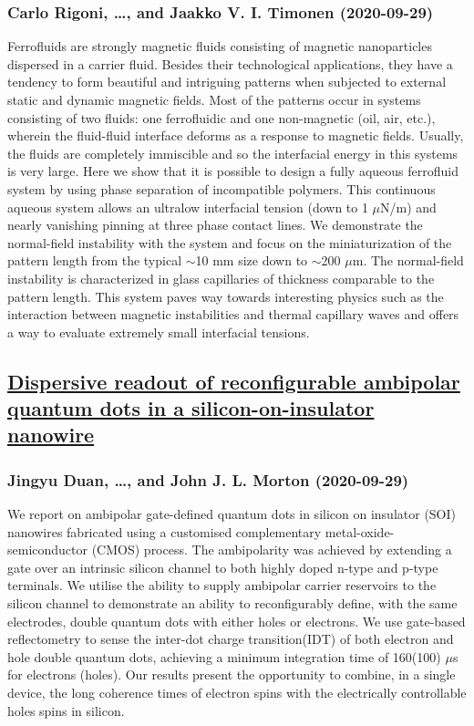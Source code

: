 \subsubsection*{Carlo Rigoni, \dots, and Jaakko V. I. Timonen (2020-09-29)}
Ferrofluids are strongly magnetic fluids consisting of magnetic nanoparticles
dispersed in a carrier fluid. Besides their technological applications, they
have a tendency to form beautiful and intriguing patterns when subjected to
external static and dynamic magnetic fields. Most of the patterns occur in
systems consisting of two fluids: one ferrofluidic and one non-magnetic (oil,
air, etc.), wherein the fluid-fluid interface deforms as a response to magnetic
fields. Usually, the fluids are completely immiscible and so the interfacial
energy in this systems is very large. Here we show that it is possible to
design a fully aqueous ferrofluid system by using phase separation of
incompatible polymers. This continuous aqueous system allows an ultralow
interfacial tension (down to 1 $\mu$N/m) and nearly vanishing pinning at three
phase contact lines. We demonstrate the normal-field instability with the
system and focus on the miniaturization of the pattern length from the typical
$\sim$10 mm size down to $\sim$200 $\mu$m. The normal-field instability is
characterized in glass capillaries of thickness comparable to the pattern
length. This system paves way towards interesting physics such as the
interaction between magnetic instabilities and thermal capillary waves and
offers a way to evaluate extremely small interfacial tensions.

\subsection*{\href{http://arxiv.org/abs/2009.13944v1}{Dispersive readout of reconfigurable ambipolar quantum dots in a  silicon-on-insulator nanowire}}
\subsubsection*{Jingyu Duan, \dots, and John J. L. Morton (2020-09-29)}
We report on ambipolar gate-defined quantum dots in silicon on insulator
(SOI) nanowires fabricated using a customised complementary
metal-oxide-semiconductor (CMOS) process. The ambipolarity was achieved by
extending a gate over an intrinsic silicon channel to both highly doped n-type
and p-type terminals. We utilise the ability to supply ambipolar carrier
reservoirs to the silicon channel to demonstrate an ability to reconfigurably
define, with the same electrodes, double quantum dots with either holes or
electrons. We use gate-based reflectometry to sense the inter-dot charge
transition(IDT) of both electron and hole double quantum dots, achieving a
minimum integration time of 160(100) $\mu$s for electrons (holes). Our results
present the opportunity to combine, in a single device, the long coherence
times of electron spins with the electrically controllable holes spins in
silicon.

